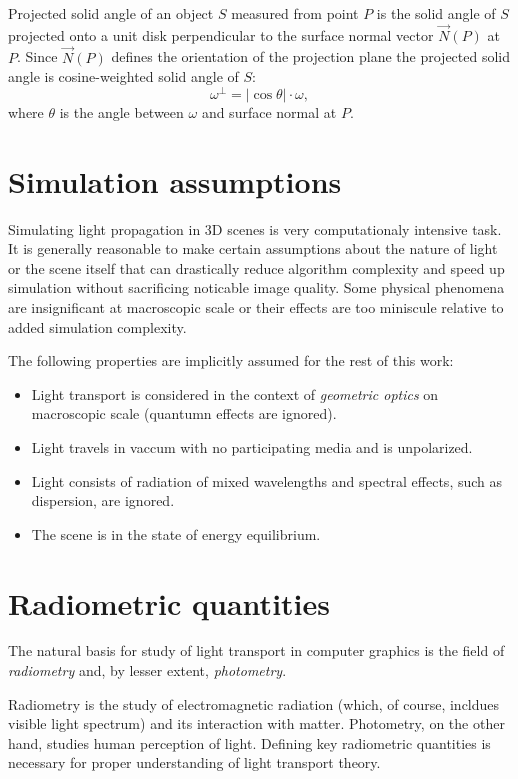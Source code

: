 \begin{df}
Projected solid angle \parencite{nicodemus76} of an object $S$ measured from point $P$ is the solid angle of $S$ projected onto a unit disk perpendicular to the surface normal vector $\vec{N}(P)$ at $P$. Since $\vec{N}(P)$ defines the orientation of the projection plane the projected solid angle is cosine-weighted solid angle of $S$:
\begin{equation}
  \omega^{\perp} = |\cos\theta| \cdot \omega ,
\end{equation}
where $\theta$ is the angle between $\omega$ and surface normal at $P$. 
\end{df}

\section{Simulation assumptions}
\label{sec:assumptions}
Simulating light propagation in 3D scenes is very computationaly intensive task. It is generally reasonable to make certain assumptions about the nature of light or the scene itself that can drastically reduce algorithm complexity and speed up simulation without sacrificing noticable image quality. Some physical phenomena are insignificant at macroscopic scale or their effects are too miniscule relative to added simulation complexity.

The following properties are implicitly assumed for the rest of this work:
\begin{itemize}
\item Light transport is considered in the context of \emph{geometric optics} on macroscopic scale (quantumn effects are ignored).
\item Light travels in vaccum with no participating media and is unpolarized.
\item Light consists of radiation of mixed wavelengths and spectral effects, such as dispersion, are ignored.
\item The scene is in the state of energy equilibrium. 
\end{itemize}

\section{Radiometric quantities}
The natural basis for study of light transport in computer graphics is the field of \emph{radiometry} and, by lesser extent, \emph{photometry}.

Radiometry is the study of electromagnetic radiation (which, of course, incldues visible light spectrum) and its interaction with matter. Photometry, on the other hand, studies human perception of light. Defining key radiometric quantities is necessary for proper understanding of light transport theory.

